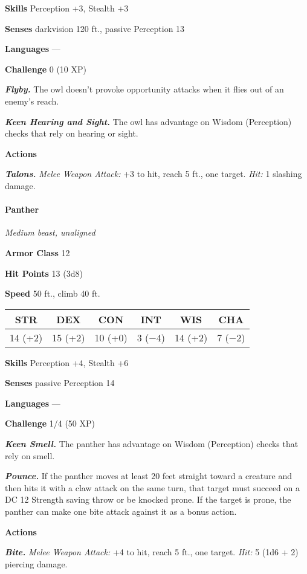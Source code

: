 \documentclass[
]{article}
\begin{document}
\textbf{Skills} Perception +3, Stealth +3

\textbf{Senses} darkvision 120 ft., passive Perception 13

\textbf{Languages} ---

\textbf{Challenge} 0 (10 XP)

\emph{\textbf{Flyby.}} The owl doesn't provoke opportunity attacks when
it flies out of an enemy's reach.

\emph{\textbf{Keen Hearing and Sight.}} The owl has advantage on Wisdom
(Perception) checks that rely on hearing or sight.

\textbf{Actions}

\emph{\textbf{Talons.}} \emph{Melee Weapon Attack:} +3 to hit, reach 5
ft., one target. \emph{Hit:} 1 slashing damage.

\hypertarget{panther}{%
\paragraph{Panther}\label{panther}}

\emph{Medium beast, unaligned}

\textbf{Armor Class} 12

\textbf{Hit Points} 13 (3d8)

\textbf{Speed} 50 ft., climb 40 ft.

\begin{longtable}[]{@{}cccccc@{}}
\toprule
STR & DEX & CON & INT & WIS & CHA\tabularnewline
\midrule
\endhead
14 (+2) & 15 (+2) & 10 (+0) & 3 (−4) & 14 (+2) & 7 (−2)\tabularnewline
\bottomrule
\end{longtable}

\textbf{Skills} Perception +4, Stealth +6

\textbf{Senses} passive Perception 14

\textbf{Languages} ---

\textbf{Challenge} 1/4 (50 XP)

\emph{\textbf{Keen Smell.}} The panther has advantage on Wisdom
(Perception) checks that rely on smell.

\emph{\textbf{Pounce.}} If the panther moves at least 20 feet straight
toward a creature and then hits it with a claw attack on the same turn,
that target must succeed on a DC 12 Strength saving throw or be knocked
prone. If the target is prone, the panther can make one bite attack
against it as a bonus action.

\textbf{Actions}

\emph{\textbf{Bite.}} \emph{Melee Weapon Attack:} +4 to hit, reach 5
ft., one target. \emph{Hit:} 5 (1d6 + 2) piercing damage.
\end{document}
